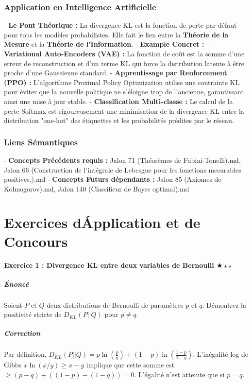 \documentclass[11pt,a4paper]{article}
\begin{document}
\section{Application en Intelligence Artificielle}

- \textbf{Le Pont Théorique :} La divergence KL est la fonction de perte par défaut pour tous les modèles probabilistes. Elle fait le lien entre la \textbf{Théorie de la Mesure} et la \textbf{Théorie de l'Information}.
- \textbf{Example Concret :}
    - \textbf{Variational Auto-Encoders (VAE) :} La fonction de coût est la somme d'une erreur de reconstruction et d'un terme KL qui force la distribution latente à être proche d'une Gaussienne standard.
    - \textbf{Apprentissage par Renforcement (PPO) :} L'algorithme Proximal Policy Optimization utilise une contrainte KL pour éviter que la nouvelle politique ne s'éloigne trop de l'ancienne, garantissant ainsi une mise à jour stable.
    - \textbf{Classification Multi-classe :} Le calcul de la perte Softmax est rigoureusement une minimisation de la divergence KL entre la distribution "one-hot" des étiquettes et les probabilités prédites par le réseau.

\section{Liens Sémantiques}

- \textbf{Concepts Précédents requis :} Jalon 71 (Théorèmes de Fubini-Tonelli).md, Jalon 66 (Construction de l'intégrale de Lebesgue pour les fonctions mesurables positives.).md
- \textbf{Concepts Futurs dépendants :} Jalon 85 (Axiomes de Kolmogorov).md, Jalon 140 (Classifieur de Bayes optimal).md

\newpage
\part{Exercices d\'Application et de Concours}
\subsection*{Exercice 1 : Divergence KL entre deux variables de Bernoulli \quad $\bigstar\star\star$}
\subsubsection*{Énoncé}
Soient $P$ et $Q$ deux distributions de Bernoulli de paramètres $p$ et $q$.
Démontrez la positivité stricte de $D_{KL}(P||Q)$ pour $p \neq q$.
\subsubsection*{Correction}
Par définition, $D_{KL}(P||Q) = p \ln\left(\frac{p}{q}\right) + (1-p) \ln\left(\frac{1-p}{1-q}\right)$.
L'inégalité log de Gibbs $x \ln(x/y) \ge x - y$ implique que cette somme est $\ge (p-q) + ((1-p)-(1-q)) = 0$.
L'égalité n'est atteinte que si $p=q$.
\end{document}
